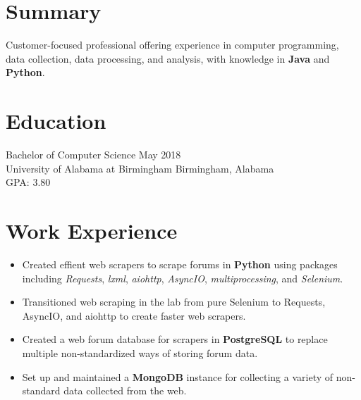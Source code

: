 \documentclass[10pt]{setzer_resume}
\begin{document}


  \section{Summary}
  Customer-focused professional offering experience in computer programming, data collection, data processing, and analysis, with knowledge in \textbf{Java} and \textbf{Python}.

  \section{Education}
  Bachelor of Computer Science \hfill May 2018 \\
  University of Alabama at Birmingham \hfill Birmingham, Alabama \\
  GPA: 3.80

  \section{Work Experience}





  \begin{itemize}[topsep=0em, itemsep=-0.5em]

    \item Created effient web scrapers to scrape forums in \textbf{Python} using packages including \textit{Requests}, \textit{lxml}, \textit{aiohttp}, \textit{AsyncIO}, \textit{multiprocessing}, and \textit{Selenium}.
    \item Transitioned web scraping in the lab from pure Selenium to Requests, AsyncIO, and aiohttp to create faster web scrapers.
    \item Created a web forum database for scrapers in \textbf{PostgreSQL} to replace multiple non-standardized ways of storing forum data.
    \item Set up and maintained a \textbf{MongoDB} instance for collecting a variety of non-standard data collected from the web.
          
  \end{itemize}
\end{document}
